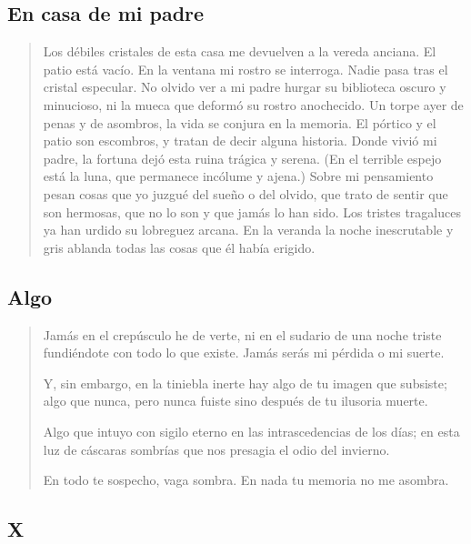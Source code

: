 \documentclass[a4paper, 12pt]{article}
\begin{document}
\pagebreak
\subsection{En casa de mi padre}

\begin{verse}
   Los débiles cristales de esta casa 
   me devuelven a la vereda anciana.
   El patio está vacío. En la ventana 
   mi rostro se interroga. Nadie pasa 
   tras el cristal especular. No olvido 
   ver a mi padre hurgar su biblioteca
   oscuro y minucioso, ni la mueca 
   que deformó su rostro anochecido.
   Un torpe ayer de penas y de asombros,
   la vida se conjura en la memoria.
   El pórtico y el patio son escombros,
   y tratan de decir alguna historia.
   Donde vivió mi padre, la fortuna 
   dejó esta ruina trágica y serena.
   (En el terrible espejo está la luna,
   que permanece incólume y ajena.)
   Sobre mi pensamiento pesan cosas 
   que yo juzgué del sueño o del olvido,
   que trato de sentir que son hermosas,
   que no lo son y que jamás lo han sido.
   Los tristes tragaluces ya han urdido
   su lobreguez arcana. En la veranda 
   la noche inescrutable y gris ablanda 
   todas las cosas que él había erigido.
\end{verse}

\pagebreak
\subsection{Algo}

\begin{verse}
    
Jamás en el crepúsculo he de verte,
ni en el sudario de una noche triste
fundiéndote con todo lo que existe.
Jamás serás mi pérdida o mi suerte.
~ 

Y, sin embargo, en la tiniebla inerte
hay algo de tu imagen que subsiste;
algo que nunca, pero nunca fuiste 
sino después de tu ilusoria muerte.
~ 

Algo que intuyo con sigilo eterno
en las intrascedencias de los días;
en esta luz de cáscaras sombrías
que nos presagia el odio del invierno.
~ 

En todo te sospecho, vaga sombra.
En nada tu memoria no me asombra.


\end{verse}

\pagebreak
\subsection{X}
\end{document}
